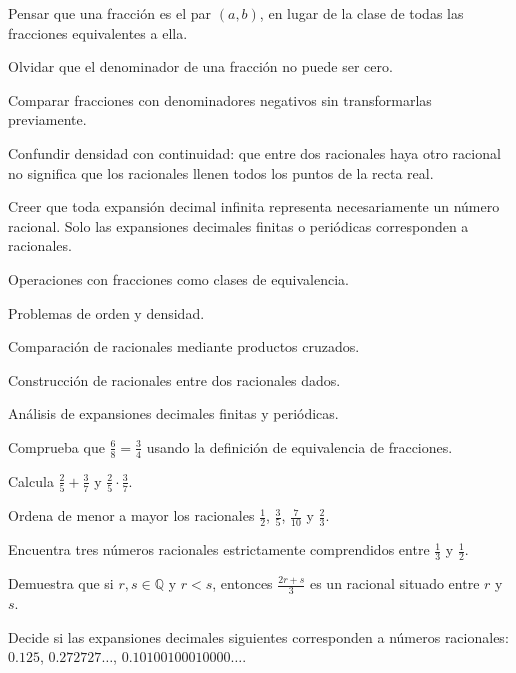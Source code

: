 \begin{erroresfrecuentes}
  \item Pensar que una fracción es el par \((a,b)\), en lugar de la clase de todas las fracciones equivalentes a ella.
  \item Olvidar que el denominador de una fracción no puede ser cero.
  \item Comparar fracciones con denominadores negativos sin transformarlas previamente.
  \item Confundir densidad con continuidad: que entre dos racionales haya otro racional no significa que los racionales llenen todos los puntos de la recta real.
  \item Creer que toda expansión decimal infinita representa necesariamente un número racional. Solo las expansiones decimales finitas o periódicas corresponden a racionales.
\end{erroresfrecuentes}

\begin{seminario}
  \item Operaciones con fracciones como clases de equivalencia.
  \item Problemas de orden y densidad.
  \item Comparación de racionales mediante productos cruzados.
  \item Construcción de racionales entre dos racionales dados.
  \item Análisis de expansiones decimales finitas y periódicas.
\end{seminario}

\begin{ejerciciospropuestos}
  \item Comprueba que \(\frac{6}{8}=\frac{3}{4}\) usando la definición de equivalencia de fracciones.
  \item Calcula \(\frac{2}{5}+\frac{3}{7}\) y \(\frac{2}{5}\cdot\frac{3}{7}\).
  \item Ordena de menor a mayor los racionales \(\frac{1}{2}\), \(\frac{3}{5}\), \(\frac{7}{10}\) y \(\frac{2}{3}\).
  \item Encuentra tres números racionales estrictamente comprendidos entre \(\frac{1}{3}\) y \(\frac{1}{2}\).
  \item Demuestra que si \(r,s\in\mathbb{Q}\) y \(r<s\), entonces \(\frac{2r+s}{3}\) es un racional situado entre \(r\) y \(s\).
  \item Decide si las expansiones decimales siguientes corresponden a números racionales: \(0.125\), \(0.272727\ldots\), \(0.10100100010000\ldots\).
\end{ejerciciospropuestos}

